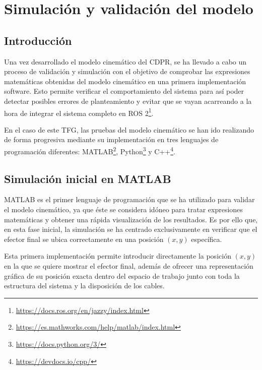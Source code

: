 \chapter{Simulación y validación del modelo}
\label{cap:capitulo5}

\section{Introducción}
\label{sec:segundaseccion}

Una vez desarrollado el modelo cinemático del CDPR, se ha llevado a cabo un proceso de validación y simulación con el objetivo de comprobar las expresiones matemáticas obtenidas del modelo cinemático en una primera implementación software. Esto permite verificar el comportamiento del sistema para así poder detectar posibles errores de planteamiento y evitar que se vayan acarreando a la hora de integrar el sistema completo en ROS 2\footnote{\url{https://docs.ros.org/en/jazzy/index.html}}.

\vspace{0.25cm}

En el caso de este TFG, las pruebas del modelo cinemático se han ido realizando de forma progresiva mediante su implementación en tres lenguajes de programación diferentes: MATLAB\footnote{\url{https://es.mathworks.com/help/matlab/index.html}}, Python\footnote{\url{https://docs.python.org/3/}} y C++\footnote{\url{https://devdocs.io/cpp/}}.

\section{Simulación inicial en MATLAB}
\label{sec:segundaseccion}

MATLAB es el primer lenguaje de programación que se ha utilizado para validar el modelo cinemático, ya que éste se considera idóneo para tratar expresiones matemáticas y obtener una rápida visualización de los resultados. Es por ello que, en esta fase inicial, la simulación se ha centrado exclusivamente en verificar que el efector final se ubica correctamente en una posición $(x,y)$ específica.

\vspace{0.25cm}

Esta primera implementación permite introducir directamente la posición $(x,y)$ en la que se quiere mostrar el efector final, además de ofrecer una representación gráfica de su posición exacta dentro del espacio de trabajo junto con toda la estructura del sistema y la disposición de los cables. 

